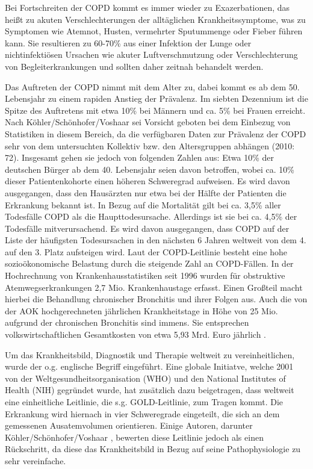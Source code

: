 Bei Fortschreiten der COPD kommt es immer wieder zu Exazerbationen, das heißt zu akuten Verschlechterungen der alltäglichen Krankheitssymptome, was zu Symptomen wie Atemnot, Husten, vermehrter Sputummenge oder Fieber führen kann. Sie resultieren zu 60-70\% aus einer Infektion der Lunge oder nichtinfektiösen Ursachen wie akuter Luftverschmutzung oder Verschlechterung von Begleiterkrankungen und sollten daher zeitnah behandelt werden.

Das Auftreten der COPD nimmt mit dem Alter zu, dabei kommt es ab dem 50. Lebensjahr zu einem rapiden Anstieg der Prävalenz. Im siebten Dezennium ist die Spitze des Auftretens mit etwa 10\% bei Männern und ca. 5\% bei Frauen erreicht\autocite[vgl.][153]{lorenz2009}. Nach Köhler/Schönhofer/Voshaar sei Vorsicht geboten bei dem Einbezug von Statistiken in diesem Bereich, da die verfügbaren Daten zur Prävalenz der COPD sehr von dem untersuchten Kollektiv bzw. den Altersgruppen abhängen (2010: 72). Insgesamt gehen sie jedoch von folgenden Zahlen aus: Etwa 10\% der deutschen Bürger ab dem 40. Lebensjahr seien davon betroffen, wobei ca. 10\% dieser Patientenkohorte einen höheren Schweregrad aufweisen. Es wird davon ausgegangen, dass den Hausärzten nur etwa bei der Hälfte der Patienten die Erkrankung bekannt ist.
In Bezug auf die Mortalität gilt bei ca. 3,5\% aller Todesfälle COPD als die Haupttodesursache. Allerdings ist sie bei ca. 4,5\% der Todesfälle mitverursachend. Es wird davon ausgegangen, dass COPD auf der Liste der häufigsten Todesursachen in den nächsten 6 Jahren weltweit von dem 4. auf den 3. Platz aufsteigen wird.
Laut der COPD-Leitlinie besteht eine hohe sozioökonomische Belastung durch die steigende Zahl an COPD-Fällen. In der Hochrechnung von Krankenhausstatistiken seit 1996 wurden für obstruktive Atemwegserkrankungen 2,7 Mio. Krankenhaustage erfasst. Einen Großteil macht hierbei die Behandlung chronischer Bronchitis und ihrer Folgen aus. Auch die von der AOK hochgerechneten jährlichen Krankheitstage in Höhe von 25 Mio. aufgrund der chronischen Bronchitis sind immens. Sie entsprechen volkswirtschaftlichen Gesamtkosten von etwa 5,93 Mrd. Euro jährlich \autocite[vgl.][e4]{vogelmeier2007}.

Um das Krankheitsbild, Diagnostik und Therapie weltweit zu vereinheitlichen, wurde der o.g. englische Begriff eingeführt. Eine globale Initiatve, welche 2001 von der Weltgesundheitsorganisation (WHO) und den National Institutes of Health (NIH) gegründet wurde, hat zusätzlich dazu beigetragen, dass weltweit eine einheitliche Leitlinie, die s.g. GOLD-Leitlinie, zum Tragen kommt. Die Erkrankung wird hiernach in vier Schweregrade eingeteilt, die sich an dem gemessenen Ausatemvolumen orientieren. Einige Autoren, darunter Köhler/Schönhofer/Voshaar \autocite[vgl.][75]{koehler2010}, bewerten diese Leitlinie jedoch als einen Rückschritt, da diese das Krankheitsbild in Bezug auf seine Pathophysiologie zu sehr vereinfache.


